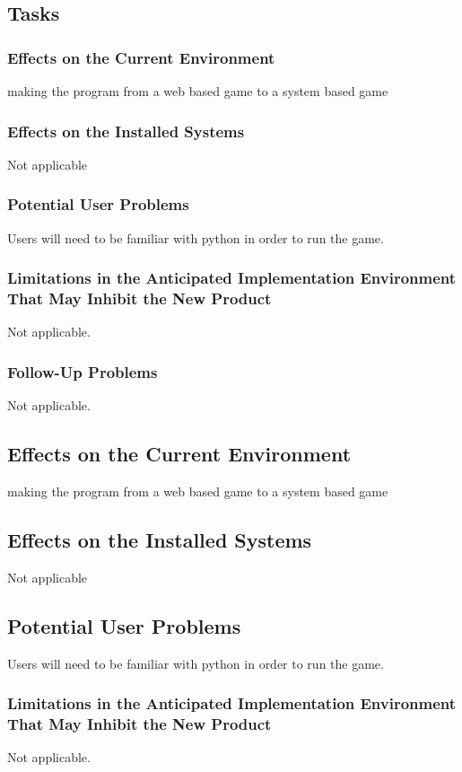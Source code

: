 \documentclass[12pt]{article}
\begin{document}
\subsection{Tasks}
\subsubsection{Effects on the Current Environment}
making the program from a web based game to a system based game
 
\subsubsection{Effects on the Installed Systems}
Not applicable
 
\subsubsection{Potential User Problems}
Users will need to be familiar with python in order to run the game.
 
\subsubsection{Limitations in the Anticipated Implementation Environment That May Inhibit the New Product}
Not applicable.
 
\subsubsection{Follow-Up Problems}
Not applicable.
\subsection{Effects on the Current Environment}
 making the program from a web based game to a system based game
 
\subsection{Effects on the Installed Systems}
 Not applicable
 
\subsection{Potential User Problems}
 Users will need to be familiar with python in order to run the game.
 
\subsubsection{Limitations in the Anticipated Implementation Environment That May Inhibit the New Product}
Not applicable.
 
\end{document}
